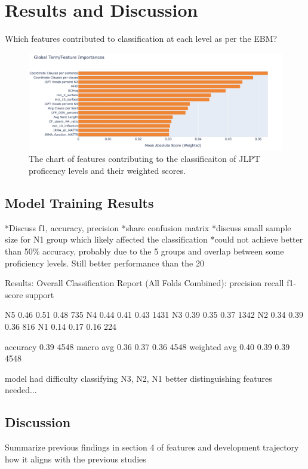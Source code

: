 \chapter{Results and Discussion}
Which features contributed to classification at each level as per the EBM?

\begin{figure}[h!]
    \centering
    \includegraphics[scale=.4]{img/feature_importance}
    \caption{The chart of features contributing to the classificaiton of JLPT proficency levels and their weighted scores.}
    \label{fig:featureimportance}
\end{figure}

\section{Model Training Results}
*Discuss f1, accuracy, precision
*share confusion matrix
*discuss small sample size for N1 group which likely affected the classification
*could not achieve better than 50\% accuracy, probably due to the 5 groups and overlap between some proficiency
levels. Still better performance than the 20%

Results:
 Overall Classification Report (All Folds Combined):
              precision    recall  f1-score   support

          N5       0.46      0.51      0.48       735
          N4       0.44      0.41      0.43      1431
          N3       0.39      0.35      0.37      1342
          N2       0.34      0.39      0.36       816
          N1       0.14      0.17      0.16       224

    accuracy                           0.39      4548
   macro avg       0.36      0.37      0.36      4548
weighted avg       0.40      0.39      0.39      4548

model had difficulty classifying N3, N2, N1 better distinguishing features needed...

\section{Discussion}
Summarize previous findings in section 4 of features and development trajectory how it aligns with the previous studies


